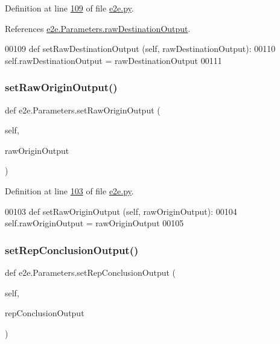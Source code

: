 Definition at line \hyperlink{e2e_8py_source_l00109}{109} of file \hyperlink{e2e_8py_source}{e2e.\+py}.



References \hyperlink{e2e_8py_source_l00038}{e2e.\+Parameters.\+raw\+Destination\+Output}.


\begin{DoxyCode}
00109     \textcolor{keyword}{def }setRawDestinationOutput (self, rawDestinationOutput):
00110         self.rawDestinationOutput = rawDestinationOutput 
00111 
\end{DoxyCode}
\mbox{\label{classe2e_1_1_parameters_a6a69b8936b79b34f612b3dda7bedc67f}} 
\subsubsection{\texorpdfstring{set\+Raw\+Origin\+Output()}{setRawOriginOutput()}}
{\footnotesize\ttfamily def e2e.\+Parameters.\+set\+Raw\+Origin\+Output (\begin{DoxyParamCaption}\item[{}]{self,  }\item[{}]{raw\+Origin\+Output }\end{DoxyParamCaption})}



Definition at line \hyperlink{e2e_8py_source_l00103}{103} of file \hyperlink{e2e_8py_source}{e2e.\+py}.


\begin{DoxyCode}
00103     \textcolor{keyword}{def }setRawOriginOutput (self, rawOriginOutput):
00104         self.rawOriginOutput = rawOriginOutput
00105 
\end{DoxyCode}
\mbox{\label{classe2e_1_1_parameters_a195ce8ca2660535573746b6f66a59ee4}} 
\subsubsection{\texorpdfstring{set\+Rep\+Conclusion\+Output()}{setRepConclusionOutput()}}
{\footnotesize\ttfamily def e2e.\+Parameters.\+set\+Rep\+Conclusion\+Output (\begin{DoxyParamCaption}\item[{}]{self,  }\item[{}]{rep\+Conclusion\+Output }\end{DoxyParamCaption})}



